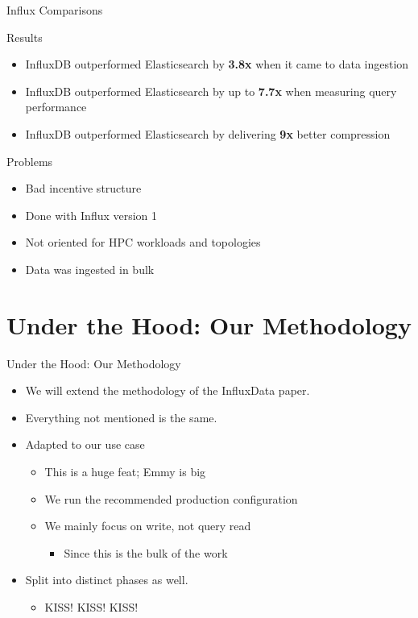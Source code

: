 \documentclass[compress,aspectratio=169]{beamer}
\begin{document}
\begin{frame}{Influx Comparisons}
\begin{block}{Results}
  \begin{itemize}
    \item InfluxDB outperformed Elasticsearch by \textbf{3.8x} when it came to data ingestion
    \item InfluxDB outperformed Elasticsearch by up to \textbf{7.7x} when measuring query performance
    \item InfluxDB outperformed Elasticsearch by delivering \textbf{9x} better compression
  \end{itemize}
\end{block}
\pause
\begin{block}{Problems}
\begin{itemize}
  \item Bad incentive structure
  \item Done with Influx version 1
  \item Not oriented for HPC workloads and topologies
  \item Data was ingested in bulk
\end{itemize}
\end{block}
\end{frame}

\section[Methodology]{Under the Hood: Our Methodology}
\begin{frame}{Under the Hood: Our Methodology}
  \begin{itemize}
    \item We will extend the methodology of the InfluxData paper.
    \item Everything not mentioned is the same.
    \item Adapted to our use case
    \begin{itemize}
      \item This is a huge feat; Emmy is big
      \item We run the recommended production configuration
      \item We mainly focus on write, not query read
      \begin{itemize}
        \item Since this is the bulk of the work
      \end{itemize}
    \end{itemize}
  \item Split into distinct phases as well.
    \begin{itemize}
      \item KISS! KISS! KISS!
    \end{itemize}
  \end{itemize}
\end{frame}
\end{document}
